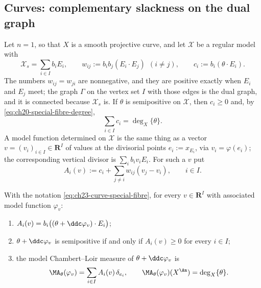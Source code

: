 \subsection{Curves: complementary slackness on the dual graph}
\label{sec:ch23-curve-orthogonality}

Let \(n=1\), so that \(X\) is a smooth projective curve, and let
\(\mathcal X\) be a regular model with
\begin{equation}\label{eq:ch23-curve-special-fibre}
 \mathcal X_s=\sum_{i\in I}b_iE_i,
 \qquad
 w_{ij}:=b_ib_j(E_i\cdot E_j)\ \ (i\ne j),
 \qquad
 c_i:=b_i(\theta\cdot E_i).
\end{equation}
The numbers \(w_{ij}=w_{ji}\) are nonnegative, and they are positive exactly
when \(E_i\) and \(E_j\) meet; the graph \(\Gamma\) on the vertex set \(I\)
with those edges is the dual graph, and it is connected because
\(\mathcal X_s\) is.  If \(\theta\) is semipositive on \(\mathcal X\), then
\(c_i\geq0\) and, by \eqref{eq:ch20-special-fibre-degree},
\begin{equation}\label{eq:ch23-curve-degree-sum}
 \sum_{i\in I}c_i=\deg_X\{\theta\} .
\end{equation}
A model function determined on \(\mathcal X\) is the same thing as a vector
\(v=(v_i)_{i\in I}\in\mathbf R^I\) of values at the divisorial points
\(e_i:=x_{E_i}\), via \(v_i=\varphi(e_i)\); the corresponding vertical
divisor is \(\sum_ib_iv_iE_i\).  For such a \(v\) put
\begin{equation}\label{eq:ch23-curve-residual-degree}
 A_i(v):=c_i+\sum_{j\ne i}w_{ij}(v_j-v_i),
 \qquad i\in I .
\end{equation}

\begin{lemma}
\label{lem:ch23-curve-residual-degree}
With the notation \eqref{eq:ch23-curve-special-fibre}, for every
\(v\in\mathbf R^I\) with associated model function \(\varphi_v\):
\begin{enumerate}
\item \(A_i(v)=b_i\bigl((\theta+\ddc\varphi_v)\cdot E_i\bigr)\);
\item \(\theta+\ddc\varphi_v\) is semipositive if and only if
\(A_i(v)\geq0\) for every \(i\in I\);
\item the model Chambert--Loir measure of \(\theta+\ddc\varphi_v\) is
\begin{equation}\label{eq:ch23-curve-model-measure}
 \MA_\theta(\varphi_v)=\sum_{i\in I}A_i(v)\,\delta_{e_i},
 \qquad
 \MA_\theta(\varphi_v)(X^{\An})=\deg_X\{\theta\} .
\end{equation}
\end{enumerate}
\end{lemma}


